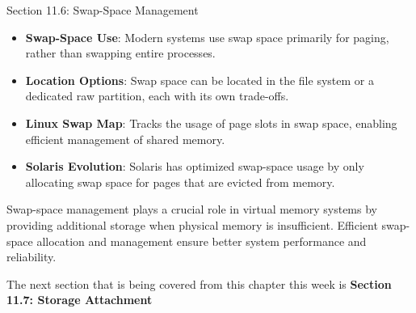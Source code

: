 \begin{notes}{Section 11.6: Swap-Space Management}
\begin{highlight}
        \begin{itemize}
            \item \textbf{Swap-Space Use}: Modern systems use swap space primarily for paging, rather than swapping entire processes.
            \item \textbf{Location Options}: Swap space can be located in the file system or a dedicated raw partition, each with its own trade-offs.
            \item \textbf{Linux Swap Map}: Tracks the usage of page slots in swap space, enabling efficient management of shared memory.
            \item \textbf{Solaris Evolution}: Solaris has optimized swap-space usage by only allocating swap space for pages that are evicted from memory.
        \end{itemize}
    
    Swap-space management plays a crucial role in virtual memory systems by providing additional storage when physical memory is insufficient. Efficient swap-space allocation and management ensure 
    better system performance and reliability.
    
    \end{highlight}

\end{notes}

The next section that is being covered from this chapter this week is \textbf{Section 11.7: Storage Attachment}

